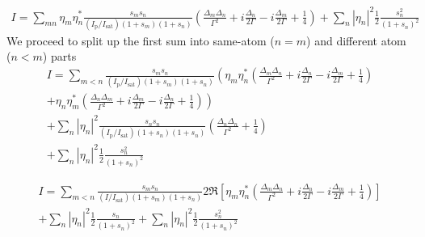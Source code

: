 \documentclass[11pt,letter]{article}
\begin{document}
\begin{multline}
 I  = 
  \sum_{mn}  \eta_{m}\eta_{n}^{*}
    \frac{ s_{m} s_{n} } { (I_{\mathrm{p}}/I_{\mathrm{sat}}) ( 1+s_{m} )( 1+s_{n} ) }
    \left(
        \frac{ \Delta_{m} \Delta_{n} }{ \Gamma^{2} } 
      + i \frac{ \Delta_{n} }{ 2 \Gamma } 
      - i \frac{ \Delta_{m} }{ 2 \Gamma } 
      + \frac{1}{4}  
    \right)  
   + \sum_{n} | \eta_{n}|^{2} \frac{1}{2} \frac{ s_{n}^{2} } { (1 + s _{n} )^{2} } 
\end{multline}
We proceed to split up the first sum into same-atom ($n=m$) and different atom ($n<m$) parts 
\begin{multline}
 I  = 
  \sum_{m<n} 
    \frac{ s_{m} s_{n} } { (I_{\mathrm{p}}/I_{\mathrm{sat}}) ( 1+s_{m} )( 1+s_{n} ) }
    \left(
        \eta_{m}\eta_{n}^{*}
    \left(
        \frac{ \Delta_{m} \Delta_{n} }{ \Gamma^{2} } 
      + i \frac{ \Delta_{n} }{ 2 \Gamma } 
      - i \frac{ \Delta_{m} }{ 2 \Gamma } 
      + \frac{1}{4}  
    \right)  \right. \\
   \left.  + 
        \eta_{n}\eta_{m}^{*}
    \left(
        \frac{ \Delta_{n} \Delta_{m} }{ \Gamma^{2} } 
      + i \frac{ \Delta_{m} }{ 2 \Gamma } 
      - i \frac{ \Delta_{n} }{ 2 \Gamma } 
      + \frac{1}{4}  
    \right) 
    \right)  \\
  + \sum_{n}  |\eta_{n}|^{2}
    \frac{ s_{n} s_{n} } { (I_{\mathrm{p}}/I_{\mathrm{sat}}) ( 1+s_{n} )( 1+s_{n} ) }
    \left(
        \frac{ \Delta_{n} \Delta_{n} }{ \Gamma^{2} } 
      + \frac{1}{4}  
    \right) \\ 
   + \sum_{n} | \eta_{n}|^{2} \frac{1}{2} \frac{ s_{n}^{2} } { (1 + s _{n} )^{2} } 
\end{multline}

\begin{multline}
 I  = 
  \sum_{m<n} 
    \frac{ s_{m} s_{n} } { (I/I_{\mathrm{sat}}) ( 1+s_{m} )( 1+s_{n} ) }
    2 \Re\left[ 
        \eta_{m}\eta_{n}^{*}
    \left(
        \frac{ \Delta_{m} \Delta_{n} }{ \Gamma^{2} } 
      + i \frac{ \Delta_{n} }{ 2 \Gamma } 
      - i \frac{ \Delta_{m} }{ 2 \Gamma } 
      + \frac{1}{4}  
    \right) \right] \\
  + \sum_{n}  |\eta_{n}|^{2}
    \frac{1}{2}	\frac{ s_{n} } { ( 1+s_{n} )^{2} }
   + \sum_{n} | \eta_{n}|^{2} \frac{1}{2} \frac{ s_{n}^{2} } { (1 + s _{n} )^{2} } 
\end{multline}
\end{document}
